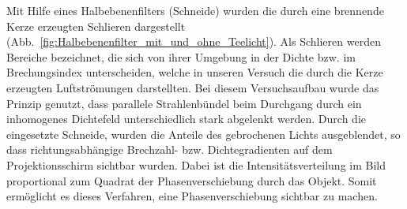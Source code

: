 Mit Hilfe eines Halbebenenfilters (Schneide) wurden die durch   eine brennende Kerze erzeugten Schlieren dargestellt (Abb.~\ref{fig:Halbebenenfilter_mit_und_ohne_Teelicht}). Als Schlieren werden Bereiche bezeichnet, die sich von ihrer Umgebung  in  der  Dichte  bzw.  im  Brechungsindex  unterscheiden,  welche  in  unseren Versuch die durch  die  Kerze erzeugten Luftströmungen darstellten. Bei diesem Versuchsaufbau  wurde  das  Prinzip  genutzt,  dass  parallele  Strahlenbündel  beim  Durchgang durch   ein   inhomogenes Dichtefeld   unterschiedlich   stark   abgelenkt   werden.   Durch   die eingesetzte  Schneide,  wurden  die  Anteile  des  gebrochenen  Lichts  ausgeblendet,  so  dass richtungsabhängige  Brechzahl-  bzw.  Dichtegradienten auf  dem  Projektionsschirm  sichtbar wurden. Dabei ist die Intensitätsverteilung im   Bild   proportional   zum   Quadrat   der Phasenverschiebung   durch   das   Objekt.   Somit   ermöglicht es dieses Verfahren, eine Phasenverschiebung sichtbar zu machen. 

